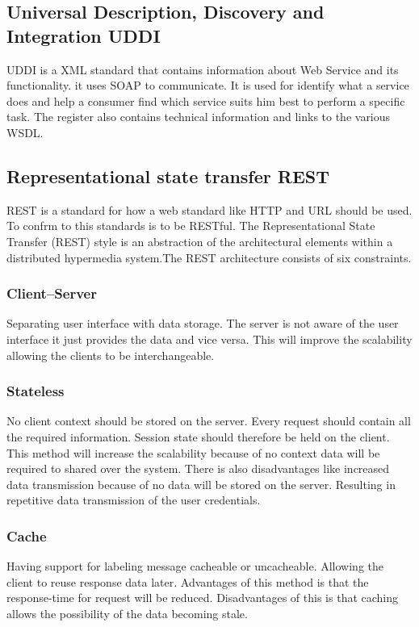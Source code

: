 \documentclass{llncs}
\begin{document}
\subsection{Universal Description, Discovery and Integration UDDI}
UDDI is a XML standard that contains information about Web Service and its functionality\cite{yang11}. it uses SOAP to communicate. It is used for identify what a service does and help a consumer find which service suits him best to perform a specific task. The register also contains technical information and links to the various WSDL.

\subsection{Representational state transfer REST}
REST is a standard for how a web standard like HTTP and URL should be used. To confrm to this standards is to be RESTful. The Representational State Transfer (REST) style is an abstraction of the architectural elements within a distributed hypermedia system\cite{rest}.The REST architecture consists of six constraints. 

\subsubsection{Client–Server}
Separating user interface with data storage. The server is not aware of the user interface it just provides the data and vice versa. This will improve the scalability allowing the clients to be interchangeable.

\subsubsection{Stateless}
No client context should be stored on the server. Every request should contain all the required information. Session state should therefore be held on the client. This method will increase the scalability because of no context data will be required to shared over the system. There is also disadvantages like increased data transmission because of no data will be stored on the server. Resulting in repetitive data transmission of the user credentials.

\subsubsection{Cache}
Having support for labeling message cacheable or uncacheable. Allowing the client  to reuse response data later. Advantages of this method is that the response-time for request will be reduced. Disadvantages of this is that caching allows the possibility of the data becoming stale.
\end{document}
